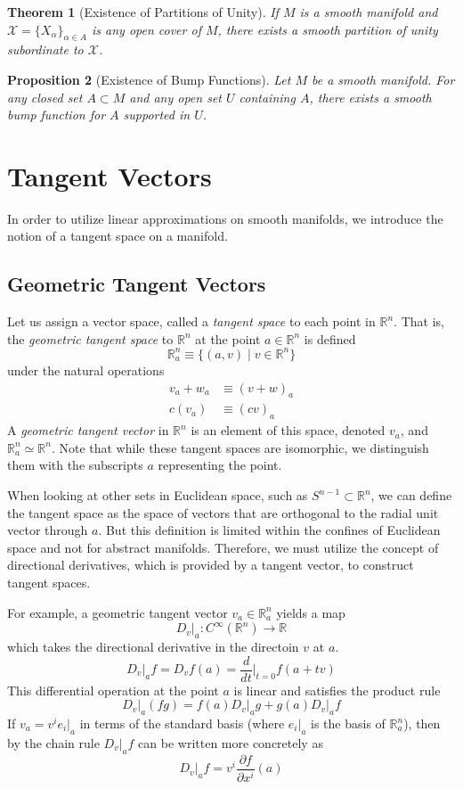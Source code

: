 \documentclass{article}
\newtheorem{theorem}{Theorem}[section]
\newtheorem{proposition}[theorem]{Proposition}
\theoremstyle{remark}
\theoremstyle{definition}
\begin{document}
\begin{theorem}[Existence of Partitions of Unity]
If $M$ is a smooth manifold and $\mathcal{X} = \{X_\alpha\}_{\alpha \in A}$ is any open cover of $M$, there exists a smooth partition of unity subordinate to $\mathcal{X}$. 
\end{theorem}

\begin{proposition}[Existence of Bump Functions]
Let $M$ be a smooth manifold. For any closed set $A \subset M$ and any open set $U$ containing $A$, there exists a smooth bump function for $A$ supported in $U$. 
\end{proposition}

\section{Tangent Vectors}
In order to utilize linear approximations on smooth manifolds, we introduce the notion of a tangent space on a manifold. 

\subsection{Geometric Tangent Vectors}
Let us assign a vector space, called a \textit{tangent space} to each point in $\mathbb{R}^n$. That is, the \textit{geometric tangent space} to $\mathbb{R}^n$ at the point $a \in \mathbb{R}^n$ is defined
\[\mathbb{R}_a^n \equiv \{(a, v) \;|\; v \in \mathbb{R}^n \}\]
under the natural operations
\begin{align*}
    v_a + w_a & \equiv (v + w)_a \\
    c (v_a) & \equiv (c v)_a
\end{align*}
A \textit{geometric tangent vector} in $\mathbb{R}^n$ is an element of this space, denoted $v_a$, and $\mathbb{R}^n_a \simeq \mathbb{R}^n$. Note that while these tangent spaces are isomorphic, we distinguish them with the subscripts $a$ representing the point. 

When looking at other sets in Euclidean space, such as $S^{n-1} \subset \mathbb{R}^n$, we can define the tangent space as the space of vectors that are orthogonal to the radial unit vector through $a$. But this definition is limited within the confines of Euclidean space and not for abstract manifolds. Therefore, we must utilize the concept of directional derivatives, which is provided by a tangent vector, to construct tangent spaces. 

For example, a geometric tangent vector $v_a \in \mathbb{R}^n_a$ yields a map
\[D_v \big|_a: C^\infty (\mathbb{R}^n) \longrightarrow \mathbb{R}\]
which takes the directional derivative in the directoin $v$ at $a$.
\[D_v \big|_a f = D_v f(a) = \frac{d}{dt} \bigg|_{t=0} f(a + t v)\]
This differential operation at the point $a$ is linear and satisfies the product rule
\[D_v \big|_a (f g) = f(a) D_v \big|_a g +g(a) D_v \big|_a f\]
If $v_a = v^i e_i |_a$ in terms of the standard basis (where $e_i |_a$ is the basis of $\mathbb{R}^n_a$), then by the chain rule $D_v |_a f$ can be written more concretely as
\[D_v \big|_a f = v^i \frac{\partial f}{\partial x^i} (a)\]
\end{document}

